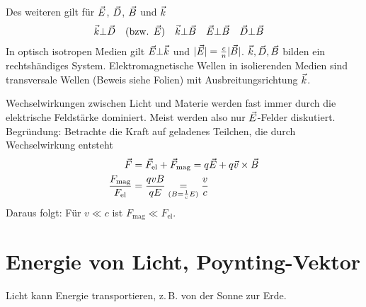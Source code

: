 %
Des weiteren gilt für $\vec{E}$, $\vec{D}$, $\vec{B}$ und $\vec{k}$
\begin{align*}
  \vec{k}&\bot\vec{D} \quad(\text{bzw. }\vec{E})&
                                            \vec{k}&\bot \vec{B}&
                                                              \vec{E}&\bot \vec{B}&
                                                                                \vec{D}&\bot\vec{B}
\end{align*}
In optisch isotropen Medien gilt $\vec{E}\bot\vec{k}$ und
$\vert\vec{E}\vert= \frac{c}{n} \vert\vec{B}\vert$.
$\vec{k},\vec{D},\vec{B}$ bilden ein rechtshändiges System.
Elektromagnetische Wellen in isolierenden Medien sind transversale
Wellen (Beweis siehe Folien) mit Ausbreitungsrichtung $\vec{k}$.

Wechselwirkungen zwischen Licht und Materie werden fast immer durch
die elektrische Feldstärke dominiert. Meist werden also nur
$\vec{E}$-Felder diskutiert. Begründung: Betrachte die Kraft auf
geladenes Teilchen, die durch Wechselwirkung entsteht
\begin{align*}
  \vec{F}
  &=\vec{F}_\text{el}+\vec{F}_\text{mag}=q\vec{E} +q\vec{v}\times\vec{B}\\
  \frac{F_\text{mag}}{F_\text{el}}
  &=\frac{qvB}{qE}
    \underset{(B=\frac{1}{c}E)}{=}\frac{v}{c}
\end{align*}%
%
%
Daraus folgt: Für $v\ll c$ ist  $F_\text{mag}\ll F_\text{el}$.

\section{Energie von Licht, Poynting-Vektor}
Licht kann Energie transportieren, z.\,B. von der Sonne zur Erde.

